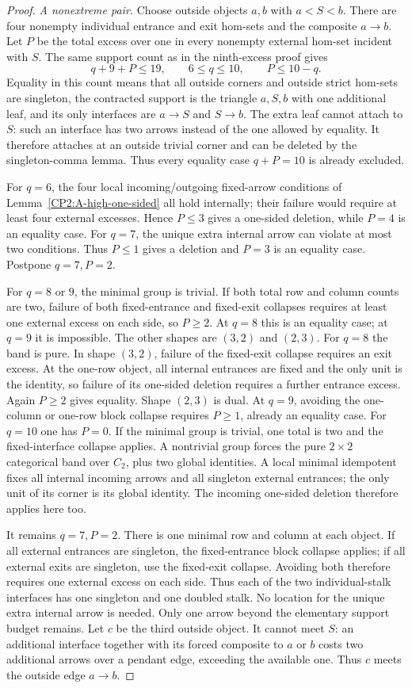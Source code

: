 \begin{proof}
\emph{A nonextreme pair.} Choose outside objects $a,b$ with
$a<S<b$. There are four nonempty individual entrance and exit
hom-sets and the composite $a\to b$. Let $P$ be the total excess
over one in every nonempty external hom-set incident with $S$.
The same support count as in the ninth-excess proof gives
\[
 q+9+P\le19,\qquad 6\le q\le10,\qquad P\le10-q.
\]
Equality in this count means that all outside corners and outside
strict hom-sets are singleton, the contracted support is the triangle
$a,S,b$ with one additional leaf, and its only interfaces are
$a\to S$ and $S\to b$. The extra leaf cannot attach to $S$:
such an interface has two arrows instead of the one allowed by
equality. It therefore attaches at an outside trivial corner and
can be deleted by the singleton-comma lemma. Thus every equality
case $q+P=10$ is already excluded.

For $q=6$, the four local incoming/outgoing fixed-arrow conditions
of Lemma~\ref{CP2:A-high-one-sided} all hold internally; their
failure would require at least four external excesses. Hence
$P\le3$ gives a one-sided deletion, while $P=4$ is an equality
case. For $q=7$, the unique extra internal arrow can violate at
most two conditions. Thus $P\le1$ gives a deletion and $P=3$
is an equality case. Postpone $q=7,P=2$.

For $q=8$ or $9$, the minimal group is trivial. If both total
row and column counts are two, failure of both fixed-entrance
and fixed-exit collapses requires at least one external excess
on each side, so $P\ge2$. At $q=8$ this is an equality case;
at $q=9$ it is impossible. The other shapes are $(3,2)$ and
$(2,3)$. For $q=8$ the band is pure. In shape $(3,2)$, failure
of the fixed-exit collapse requires an exit excess. At the
one-row object, all internal entrances are fixed and the only
unit is the identity, so failure of its one-sided deletion
requires a further entrance excess. Again $P\ge2$ gives
equality. Shape $(2,3)$ is dual. At $q=9$, avoiding the
one-column or one-row block collapse requires $P\ge1$,
already an equality case. For $q=10$ one has $P=0$.
If the minimal group is trivial, one total is two and the
fixed-interface collapse applies. A nontrivial group forces
the pure $2\times2$ categorical band over $C_2$, plus two
global identities. A local minimal idempotent fixes all
internal incoming arrows and all singleton external entrances;
the only unit of its corner is its global identity. The
incoming one-sided deletion therefore applies here too.

It remains $q=7,P=2$. There is one minimal row and column
at each object. If all external entrances are singleton, the
fixed-entrance block collapse applies; if all external exits are
singleton, use the fixed-exit collapse. Avoiding both therefore
requires one external excess on each side. Thus each of the two
individual-stalk interfaces has one singleton and one doubled
stalk. No location for the unique extra internal arrow is needed. Only one arrow beyond the elementary
support budget remains. Let $c$ be the third outside object.
It cannot meet $S$: an additional interface together with
its forced composite to $a$ or $b$ costs two additional arrows
over a pendant edge, exceeding the available one. Thus $c$
meets the outside edge $a\to b$.


\end{proof}
